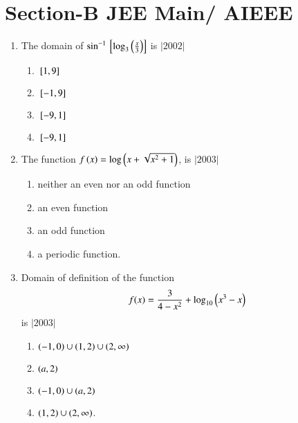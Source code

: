 \documentclass[journal,12pt,onecolumn,article]{IEEEtran}
\theoremstyle{remark}
\begin{document}
   \section*{Section-B JEE Main/ AIEEE}
	  \begin{enumerate}
		  \item The domain of $\sin^{-1}{}\left[\log_3\left(\frac{x}{3}\right)\right]$ is 
			  \hfill$|2002|$
			  \begin{enumerate}
				  \item ${}\left[1,9\right]$    
				  \item ${}\left[-1,9\right]$    
				  \item ${}\left[-9,1\right]$     
				  \item ${}\left[-9,1\right]$
			  \end{enumerate}
		  \item The function $f\left(x\right)=\log\left(x+\sqrt{x^2+1}\right)$, is 
			  \hfill$|2003|$
			  \begin{enumerate}
		  \item neither an even nor an odd function
		  \item an even function
		  \item an odd function
		  \item a periodic function.
			  \end{enumerate}
		  \item Domain of definition of the function 
			  \begin{align}
				  f(x)=\frac{3}{4-x^2}+\log_{10}\left(x^3-x\right)
			  \end{align}
			  is 
			  \hfill$|2003|$
			  \begin{enumerate}
				  \item $\left(-1,0\right)\cup\left(1,2\right)\cup\left(2,\infty\right)$     
				  \item $\left(a,2\right)$
				  \item $\left(-1,0\right)\cup\left(a,2\right)$                   
				  \item $\left(1,2\right)\cup\left(2,\infty\right)$.
			  \end{enumerate}
	  \end{enumerate}
\end{document}
